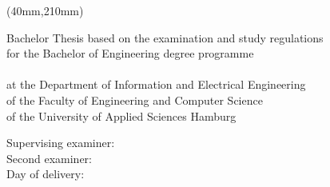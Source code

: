 %
%
\title{\IthesisTitleEN}   %
\author{\IthesisAuthor} %

\newpage
\thispagestyle{empty}
{\selectfont
  \hfuzz=20pt       %

  \vspace*{1cm}
  \begin{minipage}[b]{\textwidth}
    \fontsize{14pt}{20pt}
    \selectfont
    \begin{center}
      \IthesisAuthor
    \end{center}
  \end{minipage}

  \vspace{1.5cm}
  \begin{minipage}[b][0cm][t]{\textwidth}
    \fontsize{18pt}{20pt}
    \selectfont
    \begin{center}
      \IthesisTitleEN
    \end{center}
  \end{minipage}

  \begin{textblock*}{\textwidth}(40mm,210mm)
    \begin{minipage}[b]{\textwidth}
      \selectfont
      \fontsize{12pt}{14pt}
      \selectfont
      Bachelor Thesis based on the examination and study regulations \\
      for the Bachelor of Engineering degree programme \\
      \textit{\IstudyCourseName} \\
      at the Department of Information and Electrical Engineering \\
      of the Faculty of Engineering and Computer Science \\
      of the University of Applied Sciences Hamburg

      Supervising examiner: \IfirstSv \\
      Second examiner: \IsecondSv \\

      Day of delivery: \ISubDate \\
    \end{minipage}
  \end{textblock*}
}
